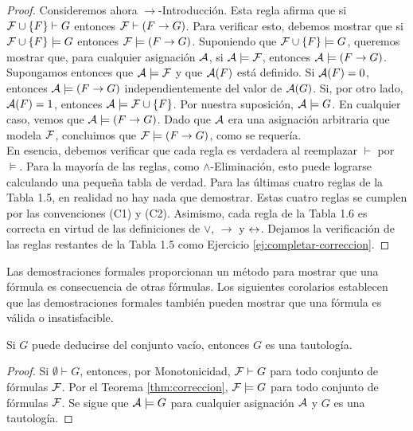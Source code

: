 \documentclass[12pt,a4paper]{book}
\begin{document}
\begin{proof}
        Consideremos ahora $\rightarrow$-Introducción. Esta regla afirma que si $\FF\cup\{F\}\vdash G$ entonces
        $\FF\vdash(F\rightarrow G)$. Para verificar esto, debemos mostrar que si $\FF\cup\{F\}\models G$ entonces
        $\FF\models(F\rightarrow G)$. Suponiendo que $\FF\cup\{F\}\models G$, queremos mostrar que, para cualquier asignación
        $\AA$, si $\AA\models\FF$, entonces $\AA\models(F\rightarrow G)$.\\
        Supongamos entonces que $\AA\models\FF$ y que $\AA(F)$ está definido. Si $\AA(F)=0$, entonces $\AA\models(F\rightarrow G)$
        independientemente del valor de $\AA(G)$. Si, por otro lado, $\AA(F)=1$, entonces $\AA\models\FF\cup\{F\}$. Por nuestra
        suposición, $\AA\models G$. En cualquier caso, vemos que $\AA\models(F\rightarrow G)$. Dado que $\AA$ era una asignación
        arbitraria que modela $\FF$, concluimos que $\FF\models(F\rightarrow G)$, como se requería.\\
        En esencia, debemos verificar que cada regla es verdadera al reemplazar $\vdash$ por $\models$. Para la mayoría de las
        reglas, como $\wedge$-Eliminación, esto puede lograrse calculando una pequeña tabla de verdad. Para las últimas cuatro
        reglas de la Tabla 1.5, en realidad no hay nada que demostrar. Estas cuatro reglas se cumplen por las convenciones (C1) y
        (C2). Asimismo, cada regla de la Tabla 1.6 es correcta en virtud de las definiciones de $\vee$, $\rightarrow$ y $\ssi$.
        Dejamos la verificación de las reglas restantes de la Tabla 1.5 como Ejercicio \ref{ej:completar-correccion}.
    \end{proof}

    Las demostraciones formales proporcionan un método para mostrar que una fórmula es consecuencia de otras fórmulas. Los
    siguientes corolarios establecen que las demostraciones formales también pueden mostrar que una fórmula es válida o
    insatisfacible.

    \begin{corolario}\label{cor:tautologia-formal}
        Si $G$ puede deducirse del conjunto vacío, entonces $G$ es una tautología.
    \end{corolario}
    \begin{proof}
        Si $\emptyset\vdash G$, entonces, por Monotonicidad, $\FF\vdash G$ para todo conjunto de fórmulas $\FF$. Por el
        Teorema \ref{thm:correccion}, $\FF\models G$ para todo conjunto de fórmulas $\FF$. Se sigue que $\AA\models G$ para
        cualquier asignación $\AA$ y $G$ es una tautología.
    \end{proof}
\end{document}
